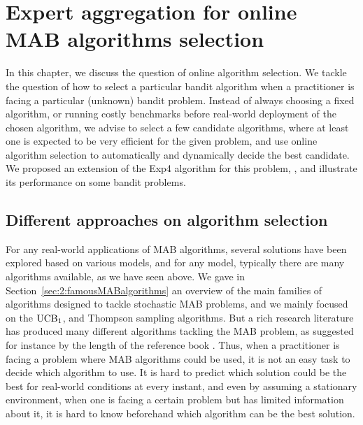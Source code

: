 
\chapter{Expert aggregation for online MAB algorithms selection}
\label{chapter:25}

\graphicspath{{2-Chapters/2-Chapter/Images/}}

\abstractStartChapter{}%
%
In this chapter, we discuss the question of online algorithm selection.
%
We tackle the question of how to select a particular bandit algorithm when a practitioner is facing a particular (unknown) bandit problem.
Instead of always choosing a fixed algorithm, or running costly benchmarks before real-world deployment of the chosen algorithm, we advise to select a few candidate algorithms, where at least one is expected to be very efficient for the given problem, and use online algorithm selection to automatically and dynamically decide the best candidate.
We proposed an extension of the Exp4 algorithm for this problem, \Aggr, and illustrate its performance on some bandit problems.

\minitocStartChapter{}


\section{Different approaches on algorithm selection}
\label{sec:25:chooseYourPreferredBanditAlgorithm}

For any real-world applications of MAB algorithms,
several solutions have been explored based on various models, and for any model, typically there are many algorithms available, as we have seen above.
%
We gave in Section~\ref{sec:2:famousMABalgorithms} an overview of the main families of algorithms designed to tackle stochastic MAB problems, and we mainly focused on the $\mathrm{UCB}_1$, \klUCB{} and Thompson sampling algorithms.
But a rich research literature has produced many different algorithms tackling the MAB problem, as suggested for instance by the length of the reference book \cite{LattimoreBanditAlgorithmsBook}.
%
Thus, when a practitioner is facing a problem where MAB algorithms could be used, it is not an easy task to decide which algorithm to use.
It is hard to predict which solution could be the best for real-world conditions at every instant,
and even by assuming a stationary environment, when one is facing a certain problem but has limited information about it, it is hard to know beforehand which algorithm can be the best solution.

